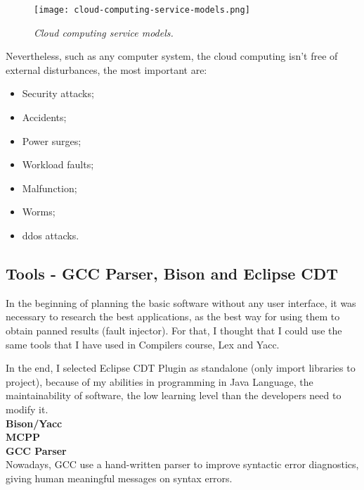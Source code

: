 \begin{figure}[!ht]
\begin{center}
\texttt{[image: cloud-computing-service-models.png]}
\caption{\small \sl Cloud computing service models.\label{fig:cloudcomputingservicemodels}}
\end{center}
\end{figure}

Nevertheless, such as any computer system, the cloud computing isn't free of external disturbances\cite{wolter2012resilience}, the most important are:
\begin{itemize}
 	\item Security attacks;
 	\item Accidents;
 	\item Power surges;
 	\item Workload faults;
 	\item Malfunction;
 	\item Worms;
 	\item \acl{ddos} attacks.
 \end{itemize}

\clearpage
\subsection{Tools - GCC Parser, Bison and Eclipse CDT}

In the beginning of planning the basic software without any user interface, it was necessary to research the best applications, as the best way for using them to obtain panned results (fault injector).
For that, I thought that I could use the same tools that I have used in Compilers course, Lex and Yacc.


In the end, I selected Eclipse CDT Plugin as standalone (only import libraries to project), because of my abilities in programming in Java Language, the maintainability of software, the low learning level than the developers need to modify it.\\

\textbf{Bison/Yacc}\\

\textbf{MCPP}\\

\textbf{GCC Parser}\\

Nowadays, GCC use a hand-written parser to improve syntactic error diagnostics, giving human meaningful messages on syntax errors.\\


